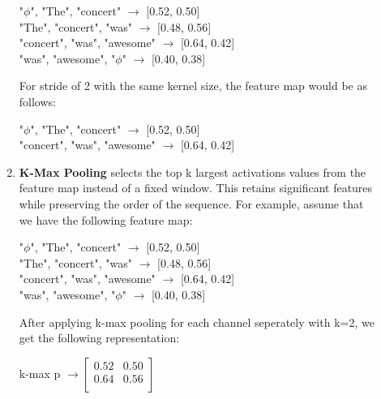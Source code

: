 \documentclass[10pt]{article}
\begin{document}
\begin{description}
\begin{enumerate}
        \begin{center}
            "$\phi$", "The", "concert" $\rightarrow$ [0.52, 0.50] \\
            "The", "concert", "was" $\rightarrow$ [0.48, 0.56] \\
            "concert", "was", "awesome" $\rightarrow$ [0.64, 0.42] \\
            "was", "awesome", "$\phi$" $\rightarrow$ [0.40, 0.38]
        \end{center}

        For stride of 2 with the same kernel size, the feature map would be as follows:

        \begin{center}
            "$\phi$", "The", "concert" $\rightarrow$ [0.52, 0.50] \\
            "concert", "was", "awesome" $\rightarrow$ [0.64, 0.42]
        \end{center}

        \item \textbf{K-Max Pooling} selects the top k largest activations values from the feature map instead of a fixed window. 
        This retains significant features while preserving the order of the sequence. For example, assume that we have the following feature map:

        \begin{center}
            "$\phi$", "The", "concert" $\rightarrow$ [0.52, 0.50] \\
            "The", "concert", "was" $\rightarrow$ [0.48, 0.56] \\
            "concert", "was", "awesome" $\rightarrow$ [0.64, 0.42] \\
            "was", "awesome", "$\phi$" $\rightarrow$ [0.40, 0.38]
        \end{center}

        After applying k-max pooling for each channel seperately with k=2, we get the following representation:

        \begin{center}
            k-max p $\displaystyle{\rightarrow \begin{bmatrix} 0.52 & 0.50 \\  0.64 & 0.56 \\ \end{bmatrix}}$
        \end{center}

    \end{enumerate}


\end{description}
\end{document}
